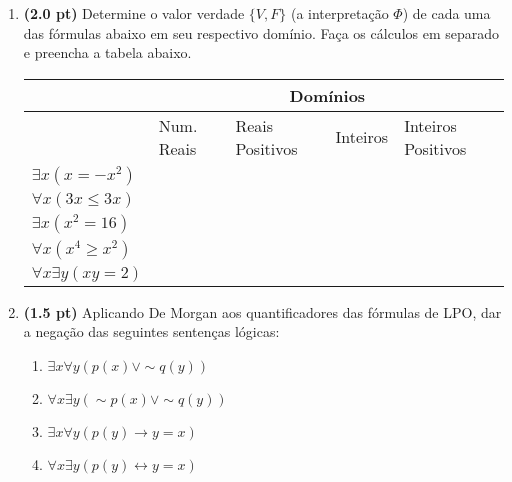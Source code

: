 \documentclass[a4paper,12pt]{article}
\begin{document}
\begin{enumerate}
\item {\bf (2.0 pt)} Determine o valor verdade $\{V, F \}$ (a interpretação $\Phi $)
de cada uma das fórmulas abaixo em seu respectivo domínio.
Faça os cálculos em separado e preencha a tabela abaixo.
\begin{center}
\begin{tabular}{l|l|l|l|l} \hline \hline
 & \multicolumn{4}{c}{Domínios} \\ \hline
 & Num. Reais & Reais Positivos & Inteiros & Inteiros Positivos \\ \hline
$\exists x (x = -x^2)$ & & & & \\ \hline
$\forall x (3x \leq 3x)$ & & & & \\ \hline
$\exists x (x^2 = 16)$ & & & & \\ \hline
$\forall x (x^4 \geq x^2)$ & & & & \\ \hline
$\forall x \exists y (xy = 2)$ & & & & \\ \hline \hline
\end{tabular}
\end{center}



\item {\bf (1.5 pt)} Aplicando De Morgan aos
quantificadores das fórmulas de LPO, dar a
negação das seguintes sentenças lógicas:
\begin{enumerate}
\setlength{\itemsep}{-2pt}
 \item $ \exists x \forall y (p(x) \vee \sim q(y))$
 \item $ \forall x \exists y (\sim p(x) \vee \sim q(y))$
  \item  $ \exists x \forall y (p(y) \rightarrow y = x)$
  \item  $ \forall x \exists y (p(y) \leftrightarrow y = x)$
\end{enumerate}


\end{enumerate}
\end{document}

